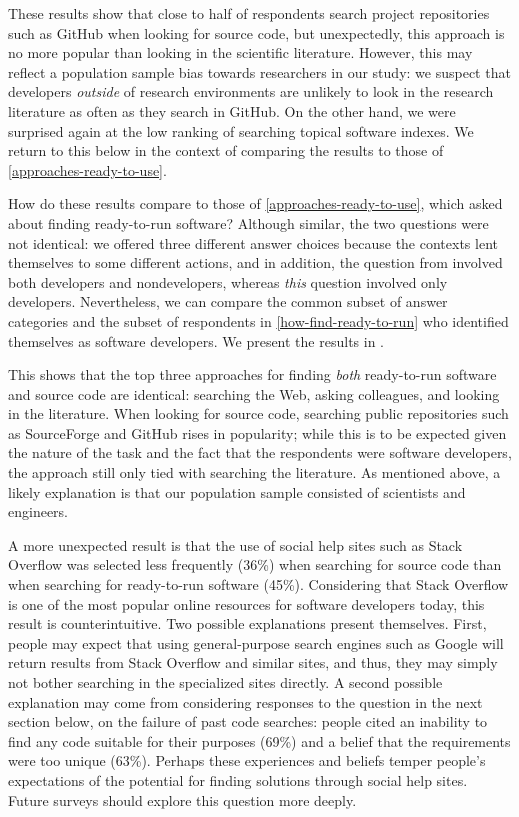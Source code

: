 \documentclass{casicswhitepaper}
\begin{document}
These results show that close to half of respondents search project repositories such as GitHub when looking for source code, but unexpectedly, this approach is no more popular than looking in the scientific literature.  However, this may reflect a population sample bias towards researchers in our study: we suspect that developers \emph{outside} of research environments are unlikely to look in the research literature as often as they search in GitHub.  On the other hand, we were surprised again at the low ranking of searching topical software indexes.  We return to this below in the context of comparing the results to those of \ref{approaches-ready-to-use}.

How do these results compare to those of \ref{approaches-ready-to-use}, which asked about finding ready-to-run software?  Although similar, the two questions were not identical: we offered three different answer choices because the contexts lent themselves to some different actions, and in addition, the question from  involved both developers and nondevelopers, whereas \emph{this} question involved only developers.  Nevertheless, we can compare the common subset of answer categories and the subset of respondents in \ref{how-find-ready-to-run} who identified themselves as software developers.  We present the results in .

This shows that the top three approaches for finding \emph{both} ready-to-run software and source code are identical: searching the Web, asking colleagues, and looking in the literature.  When looking for source code, searching public repositories such as SourceForge and GitHub rises in popularity; while this is to be expected given the nature of the task and the fact that the respondents were software developers, the approach still only tied with searching the literature.  As mentioned above, a likely explanation is that our population sample consisted of scientists and engineers.

A more unexpected result is that the use of social help sites such as Stack Overflow was selected less frequently (36\%) when searching for source code than when searching for ready-to-run software (45\%).  Considering that Stack Overflow is one of the most popular online resources for software developers today, this result is counterintuitive.  Two possible explanations present themselves.  First, people may expect that using general-purpose search engines such as Google will return results from Stack Overflow and similar sites, and thus, they may simply not bother searching in the specialized sites directly.  A second possible explanation may come from considering responses to the question in the next section below, on the failure of past code searches: people cited an inability to find any code suitable for their purposes (69\%) and a belief that the requirements were too unique (63\%).  Perhaps these experiences and beliefs temper people's expectations of the potential for finding solutions through social help sites.  Future surveys should explore this question more deeply.
\end{document}

